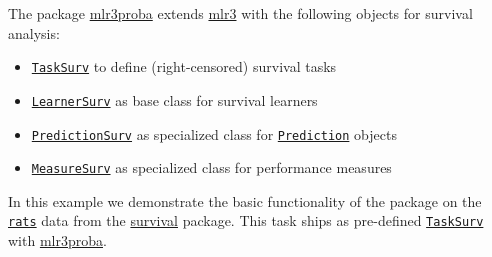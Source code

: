\documentclass[]{article}
\newenvironment{Shaded}{}{}
\newcommand{\CommentTok}[1]{\textcolor[rgb]{0.00,0.50,0.00}{#1}}
\newcommand{\KeywordTok}[1]{\textcolor[rgb]{0.00,0.00,1.00}{#1}}
\newcommand{\NormalTok}[1]{#1}
\newcommand{\OperatorTok}[1]{#1}
\newcommand{\StringTok}[1]{\textcolor[rgb]{0.00,0.50,0.50}{#1}}
\providecommand{\tightlist}{%
  \setlength{\itemsep}{0pt}\setlength{\parskip}{0pt}}
\renewenvironment{Shaded} {\begin{snugshade}\small} {\end{snugshade}}
\begin{document}
The package \href{https://mlr3proba.mlr-org.com}{mlr3proba} extends \href{https://mlr3.mlr-org.com}{mlr3} with the following objects for survival analysis:

\begin{itemize}
\tightlist
\item
  \href{https://mlr3proba.mlr-org.com/reference/TaskSurv.html}{\texttt{TaskSurv}} to define (right-censored) survival tasks
\item
  \href{https://mlr3proba.mlr-org.com/reference/LearnerSurv.html}{\texttt{LearnerSurv}} as base class for survival learners
\item
  \href{https://mlr3proba.mlr-org.com/reference/PredictionSurv.html}{\texttt{PredictionSurv}} as specialized class for \href{https://mlr3.mlr-org.com/reference/Prediction.html}{\texttt{Prediction}} objects
\item
  \href{https://mlr3proba.mlr-org.com/reference/MeasureSurv.html}{\texttt{MeasureSurv}} as specialized class for performance measures
\end{itemize}

In this example we demonstrate the basic functionality of the package on the \href{https://www.rdocumentation.org/packages/survival/topics/rats}{\texttt{rats}} data from the \href{https://cran.r-project.org/package=survival}{survival} package.
This task ships as pre-defined \href{https://mlr3proba.mlr-org.com/reference/TaskSurv.html}{\texttt{TaskSurv}} with \href{https://mlr3proba.mlr-org.com}{mlr3proba}.

\begin{Shaded}
\end{Shaded}
\end{document}
